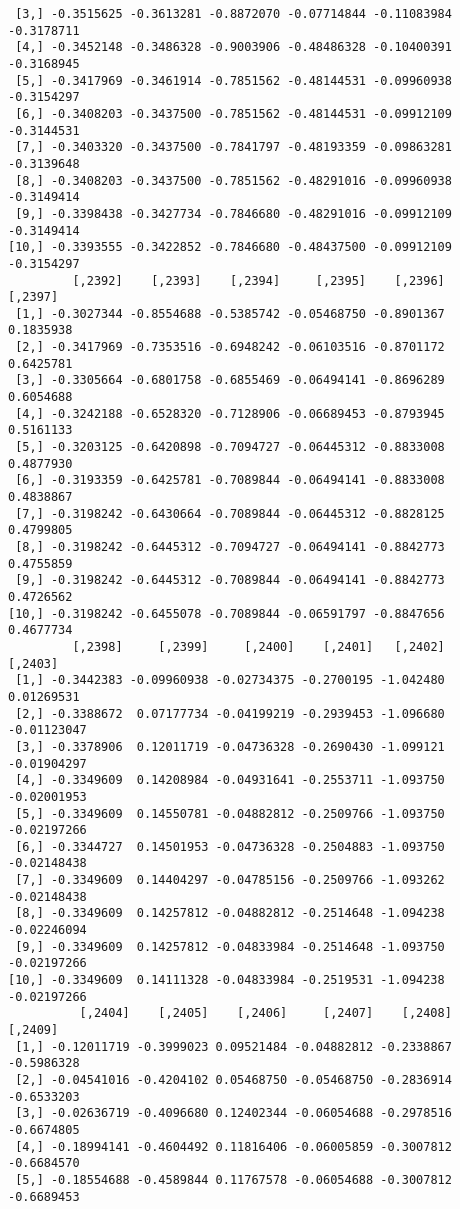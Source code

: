 \documentclass[
  letterpaper,
  DIV=11,
  numbers=noendperiod]{scrreprt}
\begin{document}
\begin{verbatim}
 [3,] -0.3515625 -0.3613281 -0.8872070 -0.07714844 -0.11083984 -0.3178711
 [4,] -0.3452148 -0.3486328 -0.9003906 -0.48486328 -0.10400391 -0.3168945
 [5,] -0.3417969 -0.3461914 -0.7851562 -0.48144531 -0.09960938 -0.3154297
 [6,] -0.3408203 -0.3437500 -0.7851562 -0.48144531 -0.09912109 -0.3144531
 [7,] -0.3403320 -0.3437500 -0.7841797 -0.48193359 -0.09863281 -0.3139648
 [8,] -0.3408203 -0.3437500 -0.7851562 -0.48291016 -0.09960938 -0.3149414
 [9,] -0.3398438 -0.3427734 -0.7846680 -0.48291016 -0.09912109 -0.3149414
[10,] -0.3393555 -0.3422852 -0.7846680 -0.48437500 -0.09912109 -0.3154297
         [,2392]    [,2393]    [,2394]     [,2395]    [,2396]   [,2397]
 [1,] -0.3027344 -0.8554688 -0.5385742 -0.05468750 -0.8901367 0.1835938
 [2,] -0.3417969 -0.7353516 -0.6948242 -0.06103516 -0.8701172 0.6425781
 [3,] -0.3305664 -0.6801758 -0.6855469 -0.06494141 -0.8696289 0.6054688
 [4,] -0.3242188 -0.6528320 -0.7128906 -0.06689453 -0.8793945 0.5161133
 [5,] -0.3203125 -0.6420898 -0.7094727 -0.06445312 -0.8833008 0.4877930
 [6,] -0.3193359 -0.6425781 -0.7089844 -0.06494141 -0.8833008 0.4838867
 [7,] -0.3198242 -0.6430664 -0.7089844 -0.06445312 -0.8828125 0.4799805
 [8,] -0.3198242 -0.6445312 -0.7094727 -0.06494141 -0.8842773 0.4755859
 [9,] -0.3198242 -0.6445312 -0.7089844 -0.06494141 -0.8842773 0.4726562
[10,] -0.3198242 -0.6455078 -0.7089844 -0.06591797 -0.8847656 0.4677734
         [,2398]     [,2399]     [,2400]    [,2401]   [,2402]     [,2403]
 [1,] -0.3442383 -0.09960938 -0.02734375 -0.2700195 -1.042480  0.01269531
 [2,] -0.3388672  0.07177734 -0.04199219 -0.2939453 -1.096680 -0.01123047
 [3,] -0.3378906  0.12011719 -0.04736328 -0.2690430 -1.099121 -0.01904297
 [4,] -0.3349609  0.14208984 -0.04931641 -0.2553711 -1.093750 -0.02001953
 [5,] -0.3349609  0.14550781 -0.04882812 -0.2509766 -1.093750 -0.02197266
 [6,] -0.3344727  0.14501953 -0.04736328 -0.2504883 -1.093750 -0.02148438
 [7,] -0.3349609  0.14404297 -0.04785156 -0.2509766 -1.093262 -0.02148438
 [8,] -0.3349609  0.14257812 -0.04882812 -0.2514648 -1.094238 -0.02246094
 [9,] -0.3349609  0.14257812 -0.04833984 -0.2514648 -1.093750 -0.02197266
[10,] -0.3349609  0.14111328 -0.04833984 -0.2519531 -1.094238 -0.02197266
          [,2404]    [,2405]    [,2406]     [,2407]    [,2408]    [,2409]
 [1,] -0.12011719 -0.3999023 0.09521484 -0.04882812 -0.2338867 -0.5986328
 [2,] -0.04541016 -0.4204102 0.05468750 -0.05468750 -0.2836914 -0.6533203
 [3,] -0.02636719 -0.4096680 0.12402344 -0.06054688 -0.2978516 -0.6674805
 [4,] -0.18994141 -0.4604492 0.11816406 -0.06005859 -0.3007812 -0.6684570
 [5,] -0.18554688 -0.4589844 0.11767578 -0.06054688 -0.3007812 -0.6689453

\end{verbatim}
\end{document}
